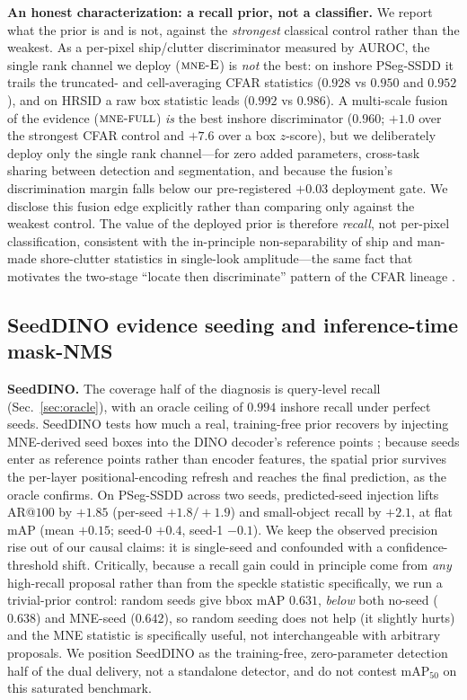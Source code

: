 \documentclass[journal]{IEEEtran}
\begin{document}
\textbf{An honest characterization: a recall prior, not a classifier.} We report what the prior is and is not, against the \emph{strongest} classical control rather than the weakest. As a per-pixel ship/clutter discriminator measured by AUROC, the single rank channel we deploy ($\textsc{mne-E}$) is \emph{not} the best: on inshore PSeg-SSDD it trails the truncated- and cell-averaging CFAR statistics ($0.928$ vs $0.950$ and $0.952$), and on HRSID a raw box statistic leads ($0.992$ vs $0.986$). A multi-scale fusion of the evidence ($\textsc{mne-full}$) \emph{is} the best inshore discriminator ($0.960$; $+1.0$ over the strongest CFAR control and $+7.6$ over a box $z$-score), but we deliberately deploy only the single rank channel---for zero added parameters, cross-task sharing between detection and segmentation, and because the fusion's discrimination margin falls below our pre-registered $+0.03$ deployment gate. We disclose this fusion edge explicitly rather than comparing only against the weakest control. The value of the deployed prior is therefore \emph{recall}, not per-pixel classification, consistent with the in-principle non-separability of ship and man-made shore-clutter statistics in single-look amplitude---the same fact that motivates the two-stage ``locate then discriminate'' pattern of the CFAR lineage \cite{finn1968cfar}.

\subsection{SeedDINO evidence seeding and inference-time mask-NMS}
\label{sec:seeddino}
\textbf{SeedDINO.} The coverage half of the diagnosis is query-level recall (Sec.~\ref{sec:oracle}), with an oracle ceiling of $0.994$ inshore recall under perfect seeds. SeedDINO tests how much a real, training-free prior recovers by injecting MNE-derived seed boxes into the DINO decoder's reference points \cite{zhang2023dino}; because seeds enter as reference points rather than encoder features, the spatial prior survives the per-layer positional-encoding refresh and reaches the final prediction, as the oracle confirms. On PSeg-SSDD across two seeds, predicted-seed injection lifts AR@$100$ by $+1.85$ (per-seed $+1.8/+1.9$) and small-object recall by $+2.1$, at flat mAP (mean $+0.15$; seed-0 $+0.4$, seed-1 $-0.1$). We keep the observed precision rise out of our causal claims: it is single-seed and confounded with a confidence-threshold shift. Critically, because a recall gain could in principle come from \emph{any} high-recall proposal rather than from the speckle statistic specifically, we run a trivial-prior control: random seeds give bbox mAP $0.631$, \emph{below} both no-seed ($0.638$) and MNE-seed ($0.642$), so random seeding does not help (it slightly hurts) and the MNE statistic is specifically useful, not interchangeable with arbitrary proposals. We position SeedDINO as the training-free, zero-parameter detection half of the dual delivery, not a standalone detector, and do not contest mAP$_{50}$ on this saturated benchmark.
\end{document}
